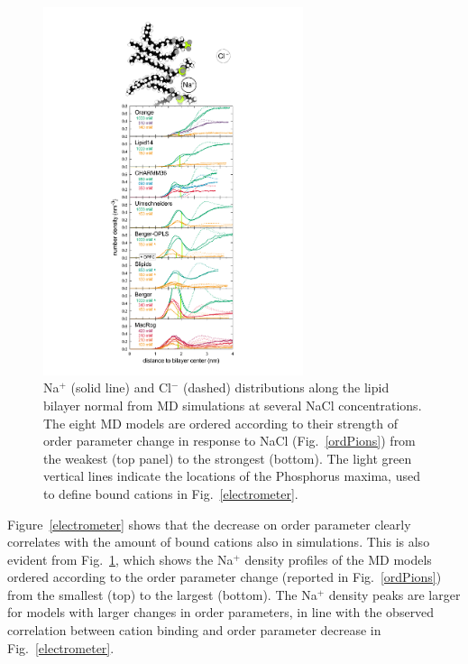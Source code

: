 \documentclass[twoside,twocolumn,9pt]{article}
\begin{document}
\begin{figure}[!h]
  \centering
  \includegraphics[width=7.625cm]{../Fig/NaDensities_withSnap.pdf}
  \caption{\label{NAdensities}
    Na$^+$ (solid line) and Cl$^-$ (dashed) distributions along the lipid bi\-layer normal from MD simulations
    at several NaCl concentrations.
    The eight MD models are ordered according to their strength of order parameter change in response to NaCl
    (Fig.~\ref{ordPions})
    from the weakest (top panel) to the strongest (bottom).
    The light green vertical lines indicate the locations of the Phosphorus maxima,
    used to define bound cations in Fig.~\ref{electrometer}.
}
\end{figure}
%
Figure~\ref{electrometer} shows that the decrease on order parameter clearly correlates with the
amount of bound cations also in simulations. This is also evident from Fig.~\ref{NAdensities},
which shows the Na$^+$ density profiles of the MD models ordered according to the order parameter change 
(reported in Fig.~\ref{ordPions}) from the smallest (top) to the largest (bottom).
The Na$^+$ density peaks are larger for models with larger changes in order parameters,
in line with the observed correlation between cation binding and order parameter decrease in
Fig.~\ref{electrometer}.
\end{document}
